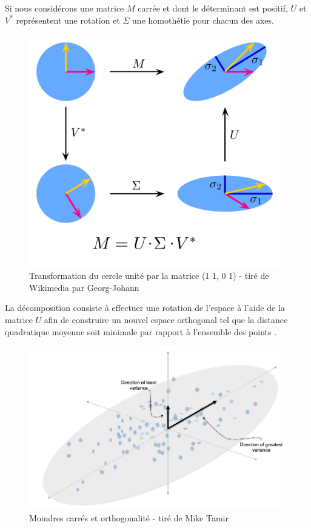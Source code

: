 Si nous considérons une matrice $M$ carrée et dont le déterminant est positif, $U$ et $V^{*}$ représentent une rotation et $\Sigma$ une homothétie pour chacun des axes.

\begin{figure}[h]
\begin{center}
    \includegraphics[scale=0.5]{Methodologie/Singular-Value-Decomposition.png}
    \caption{Transformation du cercle unité par la matrice (1 1, 0 1) - tiré de Wikimedia par Georg-Johann}
\end{center}
\end{figure}

La décomposition consiste à effectuer une rotation de l'espace à l'aide de la matrice $U$ afin de construire un nouvel espace orthogonal tel que la distance quadratique moyenne soit minimale par rapport à l'ensemble des points \cite{lawson1974solving}.

\begin{figure}[h]
\begin{center}
    \includegraphics[scale=0.35]{Methodologie/main-qimg-fdce4658f6db6fa90ab42bff2ff81c61.jpg}
    \caption{Moindres carrés et orthogonalité - tiré de Mike Tamir}
\end{center}
\end{figure}

